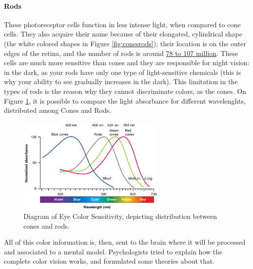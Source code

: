 \paragraph{Rods}
%
These photoreceptor cells function in less intense light, when compared to cone cells. They also acquire
their name because of their elongated, cylindrical shape (the white colored shapes in Figure \ref{fig:conesrods});
their location is on the outer edges of the retina, and the number of rods is around \underline{78 to 107 million}. These
cells are much more sensitive than
cones and they are responsible for night vision: in the dark, as your rods have only one type of light-sensitive chemicals (this is why your ability to see gradually increases in the dark). This limitation in the types of rods is the
reason why they cannot discriminate colors, as the cones. On Figure \ref{fig:colorsensitivity}, it is possible to compare
the light absorbance for different wavelenghts, distributed among Cones and Rods. \\ \par
%
\begin{figure}[H]
	\centering
    \vspace{-15pt}
    \includegraphics[width=0.65\textwidth]{images/background/Eye_Color_Sensitivity.jpg}
    \caption[Diagram of Eye Color Sensitivity]{Diagram of Eye Color Sensitivity, depicting distribution between cones and rods.\protect\footnotemark{}}
    \vspace{-15pt}
    \label{fig:colorsensitivity}
\end{figure}
%
All of this color information is, then, sent to the brain where it will be processed and associated to a
mental model. Psychologists tried to explain how the complete color vision works, and formulated some
theories about that.
%
